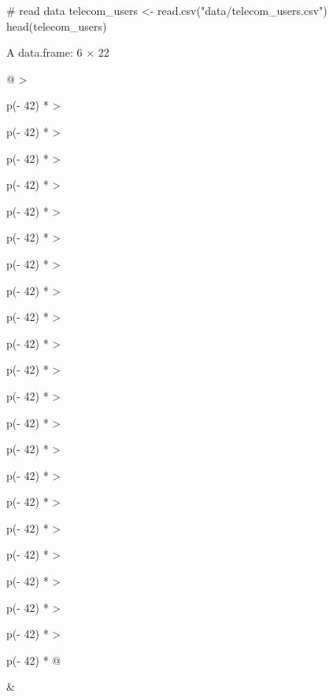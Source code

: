 \documentclass[
  letterpaper,
  DIV=11,
  numbers=noendperiod]{scrreprt}
\newenvironment{Shaded}{\begin{snugshade}}{\end{snugshade}}
\newcommand{\CommentTok}[1]{\textcolor[rgb]{0.37,0.37,0.37}{#1}}
\newcommand{\FunctionTok}[1]{\textcolor[rgb]{0.28,0.35,0.67}{#1}}
\newcommand{\NormalTok}[1]{\textcolor[rgb]{0.00,0.23,0.31}{#1}}
\newcommand{\OtherTok}[1]{\textcolor[rgb]{0.00,0.23,0.31}{#1}}
\newcommand{\StringTok}[1]{\textcolor[rgb]{0.13,0.47,0.30}{#1}}
\begin{document}
\begin{Shaded}
\begin{Highlighting}[]
\CommentTok{\# read data}
\NormalTok{telecom\_users }\OtherTok{\textless{}{-}} \FunctionTok{read.csv}\NormalTok{(}\StringTok{"data/telecom\_users.csv"}\NormalTok{)}
\FunctionTok{head}\NormalTok{(telecom\_users)}
\end{Highlighting}
\end{Shaded}

A data.frame: 6 × 22

\begin{longtable}[]{@{}
  >{\raggedright\arraybackslash}p{(\columnwidth - 42\tabcolsep) * }
  >{\raggedright\arraybackslash}p{(\columnwidth - 42\tabcolsep) * }
  >{\raggedright\arraybackslash}p{(\columnwidth - 42\tabcolsep) * }
  >{\raggedright\arraybackslash}p{(\columnwidth - 42\tabcolsep) * }
  >{\raggedright\arraybackslash}p{(\columnwidth - 42\tabcolsep) * }
  >{\raggedright\arraybackslash}p{(\columnwidth - 42\tabcolsep) * }
  >{\raggedright\arraybackslash}p{(\columnwidth - 42\tabcolsep) * }
  >{\raggedright\arraybackslash}p{(\columnwidth - 42\tabcolsep) * }
  >{\raggedright\arraybackslash}p{(\columnwidth - 42\tabcolsep) * }
  >{\raggedright\arraybackslash}p{(\columnwidth - 42\tabcolsep) * }
  >{\raggedright\arraybackslash}p{(\columnwidth - 42\tabcolsep) * }
  >{\raggedright\arraybackslash}p{(\columnwidth - 42\tabcolsep) * }
  >{\raggedright\arraybackslash}p{(\columnwidth - 42\tabcolsep) * }
  >{\raggedright\arraybackslash}p{(\columnwidth - 42\tabcolsep) * }
  >{\raggedright\arraybackslash}p{(\columnwidth - 42\tabcolsep) * }
  >{\raggedright\arraybackslash}p{(\columnwidth - 42\tabcolsep) * }
  >{\raggedright\arraybackslash}p{(\columnwidth - 42\tabcolsep) * }
  >{\raggedright\arraybackslash}p{(\columnwidth - 42\tabcolsep) * }
  >{\raggedright\arraybackslash}p{(\columnwidth - 42\tabcolsep) * }
  >{\raggedright\arraybackslash}p{(\columnwidth - 42\tabcolsep) * }
  >{\raggedright\arraybackslash}p{(\columnwidth - 42\tabcolsep) * }
  >{\raggedright\arraybackslash}p{(\columnwidth - 42\tabcolsep) * }@{}}
\toprule\noalign{}
\begin{minipage}[b]{\linewidth}\raggedright
\end{minipage} & \begin{minipage}[b]{\linewidth}\raggedright

\end{minipage}
\end{longtable}
\end{document}
